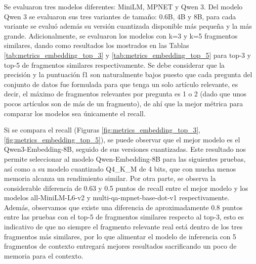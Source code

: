 Se evaluaron tres modelos diferentes: MiniLM, MPNET y Qwen 3. Del modelo
Qwen 3 se evaluaron sus tres variantes de tamaño: 0.6B, 4B y 8B, para
cada variante se evaluó además su versión cuantizada disponible más pequeña y
la más grande. Adicionalmente, se evaluaron los modelos con k=3 y k=5
fragmentos similares, dando como resultados los mostrados en las Tablas
\ref{tab:metrics_embedding_top_3} y \ref{tab:metrics_embedding_top_5} para
top-3 y top-5 de fragmentos similares respectivamente. Se debe considerar que la precisión
y la puntuación f1 son naturalmente bajos puesto que cada pregunta del conjunto
de datos fue formulada para que tenga un solo artículo relevante, es decir,
el máximo de fragmentos relevantes por pregunta es 1 o 2 (dado que unos pocos
artículos son de más de un fragmento), de ahí que la mejor
métrica para comparar los modelos sea únicamente el recall.

Si se compara el recall (Figuras
\ref{fig:metrics_embedding_top_3}, \ref{fig:metrics_embedding_top_5}), se
puede observar que el mejor modelo es el Qwen3-Embedding-8B, seguido de sus
versiones cuantizadas. Este resultado nos permite seleccionar al modelo
Qwen-Embedding-8B para las siguientes pruebas, así como a su modelo
cuantizado Q4\_K\_M de 4 bits, que con mucha menos memoria alcanza un
rendimiento similar. Por otra parte, se observa la considerable diferencia
de 0.63 y 0.5 puntos de recall entre el mejor modelo y los modelos
all-MiniLM-L6-v2 y multi-qa-mpnet-base-dot-v1 respectivamente. Además,
observamos que existe una diferencia de aproximadamente 0.8 puntos entre
las pruebas con el top-5 de fragmentos similares respecto al top-3, esto es indicativo
de que no siempre el fragmento relevante real está dentro de los tres
fragmentos más similares, por
lo que alimentar el modelo de inferencia con 5 fragmentos de contexto entregará
mejores resultados sacrificando un poco de memoria para el contexto.


